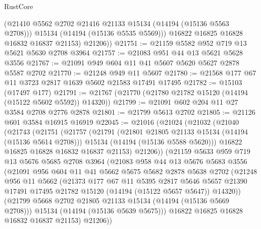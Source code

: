 \begin{lexlean}{RustCore}
\begin{coremodule}
            (@21410 @5562 @2702 @21416 @21133 @15134 (@14194 (@15136 @5563 @2708)))
            @15134
            (@14194 (@15136 @5535 @5569)))
          @16822
          @16825
          @16828
          @16832
          @16837
          @21153)
        @21206))
@21751 := @21159 @5582 @952 @719 @13 @5621 @5630 @2708 @3964
@21757 := @21083 @951 @44 @13 @5621 @5628 @3556
@21767 := @21091 @949 @604 @11 @41 @5607 @5620 @5627 @2878 @5587 @2702
@21770 := @21248 @949 @11 @5607
@21780 := @21568 @177 @67 @11 @3723 @2817 @1639 @5602 @21583 @17491 @17495
@21782 := @15103 (@17497 @177)
@21791 := @21767 (@21770 (@21780 @21782 @15120 (@14194 (@15122 @5602 @5592)) @14320))
@21799 := @21091 @602 @204 @11 @27 @3584 @2708 @2776 @2878
@21801 := @21799 @5613 @2702
@21805 := @21126 @601 @3584 @16915 @16919
@22045 := @21016
    (@21024
      (@21032
        (@21040
          (@21743
            (@21751
              (@21757
                (@21791
                  (@21801 @21805 @21133 @15134 (@14194 (@15136 @5614 @2708)))
                  @15134
                  (@14194 (@15136 @5588 @5620)))
                @16822
                @16825
                @16828
                @16832
                @16837
                @21153)
              @21206))
          (@21159
            @5633
            @959
            @719
            @13
            @5676
            @5685
            @2708
            @3964
            (@21083
              @958
              @44
              @13
              @5676
              @5683
              @3556
              (@21091
                @956
                @604
                @11
                @41
                @5662
                @5675
                @5682
                @2878
                @5638
                @2702
                (@21248
                  @956
                  @11
                  @5662
                  (@21373
                    @177
                    @67
                    @11
                    @5395
                    @2817
                    @5646
                    @5657
                    @21390
                    @17491
                    @17495
                    @21782
                    @15120
                    (@14194 (@15122 @5657 @5647))
                    @14320))
                (@21799 @5668 @2702 @21805 @21133 @15134 (@14194 (@15136 @5669 @2708)))
                @15134
                (@14194 (@15136 @5639 @5675)))
              @16822
              @16825
              @16828
              @16832
              @16837
              @21153)
            @21206))

\end{coremodule}
\end{lexlean}
